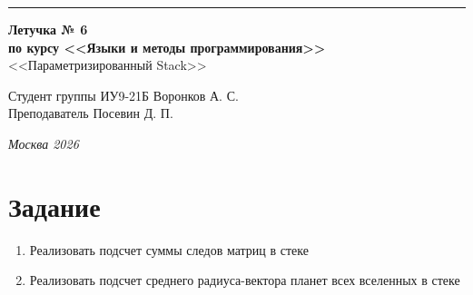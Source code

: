 \documentclass[a4paper, 14pt]{extarticle}
\begin{document}
\begin{titlepage}
\vspace*{-16pt}
\hspace{30pt}\rule{0.866\textwidth}{0.4pt}
  
\vspace{11em}

\begin{center}
\Large {\bf Летучка № 6} \\ 
\large {\bf по курсу <<Языки и методы программирования>>} \\ 
\large <<Параметризированный Stack>>
\end{center}\normalsize

\vspace{8em}


\begin{flushright}
  {Студент группы ИУ9-21Б Воронков А. С.\hspace*{15pt} \\
  \vspace{2ex}
  Преподаватель Посевин Д. П.\hspace*{15pt}}
\end{flushright}

\bigskip

\vfill
 

\begin{center}
\textsl{Москва 2026}
\end{center}
\end{titlepage}

\renewcommand{\ttdefault}{pcr}

\setlength{\tabcolsep}{3pt}
\newpage
\setcounter{page}{2}

\section{Задание}
\begin{enumerate}
    \item Реализовать подсчет суммы следов матриц в стеке
    \item Реализовать подсчет среднего радиуса-вектора планет всех вселенных в стеке
\end{enumerate}
\end{document}
